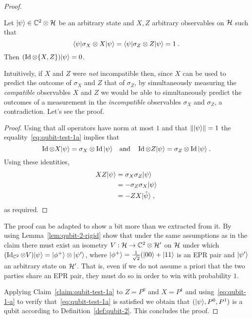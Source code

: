 \begin{proof}
\begin{claim}\label{claim:qubit-test-1a}
Let $|\psi\rangle \in \mathbb{C}^2 \otimes \mathcal{H}$ be an arbitrary state and $X,Z$ arbitrary observables on $\mathcal{H}$ such that 
\begin{equation}\label{eq:qubit-test-1a}
 \langle\psi| \sigma_X \otimes X |\psi\rangle = \langle\psi| \sigma_Z \otimes Z |\psi\rangle = 1\;.
\end{equation}
Then $(\mathop{\rm Id}\nolimits \otimes \{X,Z\})|\psi\rangle = 0$. 
\end{claim}

Intuitively, if $X$ and $Z$ were \emph{not} incompatible then, since $X$ can be used to predict the outcome of $\sigma_X$ and $Z$ that of $\sigma_Z$, by simultaneously measuring the \emph{compatible} observables $X$ and $Z$ we would be able to simultaneously predict the outcomes of a measurement in the \emph{incompatible} observables $\sigma_X$ and $\sigma_Z$, a contradiction. Let's see the proof. 

\begin{proof}
Using that all operators have norm at most $1$ and that $\||\psi\rangle\|=1$ the equality~\eqref{eq:qubit-test-1a} implies that
\[ \mathop{\rm Id}\nolimits\otimes X |{\psi}\rangle = \sigma_X \otimes \mathop{\rm Id}\nolimits |{\psi}\rangle\quad\text{and}
\quad \mathop{\rm Id}\nolimits\otimes Z |{\psi}\rangle = \sigma_Z \otimes \mathop{\rm Id}\nolimits |{\psi}\rangle\;.\]
Using these identities, 
\begin{align*}
XZ|{\psi}\rangle &= \sigma_X \sigma_Z |{\psi}\rangle\\
&= -\sigma_Z \sigma_X |{\psi}\rangle\\
&= - ZX |\tilde{\psi}\rangle \;,
\end{align*}
as required. 
\end{proof}

\begin{exercise}
The proof can be adapted to show a bit more than we extracted from it. By using Lemma~\ref{lem:qubit-2-rigid} show that under the same assumptions as in the claim there must exist an isometry $V:\mathcal{H}\to\mathbb{C}^2 \otimes \mathcal{H}'$ on $\mathcal{H}$ under which $(\mathop{\rm Id}\nolimits_{\mathbb{C}^2} \otimes V)|\psi\rangle = |\phi^+\rangle \otimes |\psi'\rangle$, where $|\phi^+\rangle = \frac{1}{\sqrt{2}}(|00\rangle+|11\rangle$ is an EPR pair and $|\psi'\rangle$ an arbitrary state on $\mathcal{H}'$. That is, even if we do not assume a priori that the two parties share an EPR pair, they must do so in order to win with probability $1$.
\end{exercise}

Applying Claim~\ref{claim:qubit-test-1a} to $Z=P^0$ and $X=P^1$ and using~\eqref{eq:qubit-1-a} to verify that~\eqref{eq:qubit-test-1a} is satisfied we obtain that 
 $(|{\psi}\rangle,P^0,P^1)$ is a qubit according to Definition~\ref{def:qubit-2}. This concludes the proof.
\end{proof}


